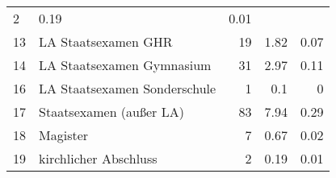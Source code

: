 \begin{longtable}{lXrrr}
       \num{2} &
       \num[round-mode=places,round-precision=2]{0.19} &
         \num[round-mode=places,round-precision=2]{0.01} \\

     13 &
     \multicolumn{1}{X}{ LA Staatsexamen GHR   } &


       \num{19} &
       \num[round-mode=places,round-precision=2]{1.82} &
         \num[round-mode=places,round-precision=2]{0.07} \\

     14 &
     \multicolumn{1}{X}{ LA Staatsexamen Gymnasium   } &


       \num{31} &
       \num[round-mode=places,round-precision=2]{2.97} &
         \num[round-mode=places,round-precision=2]{0.11} \\

     16 &
     \multicolumn{1}{X}{ LA Staatsexamen Sonderschule   } &


       \num{1} &
       \num[round-mode=places,round-precision=2]{0.1} &
         \num[round-mode=places,round-precision=2]{0} \\

     17 &
     \multicolumn{1}{X}{ Staatsexamen (außer LA)   } &


       \num{83} &
       \num[round-mode=places,round-precision=2]{7.94} &
         \num[round-mode=places,round-precision=2]{0.29} \\

     18 &
     \multicolumn{1}{X}{ Magister   } &


       \num{7} &
       \num[round-mode=places,round-precision=2]{0.67} &
         \num[round-mode=places,round-precision=2]{0.02} \\

     19 &
     \multicolumn{1}{X}{ kirchlicher Abschluss   } &


       \num{2} &
       \num[round-mode=places,round-precision=2]{0.19} &
         \num[round-mode=places,round-precision=2]{0.01} \\


\end{longtable}
